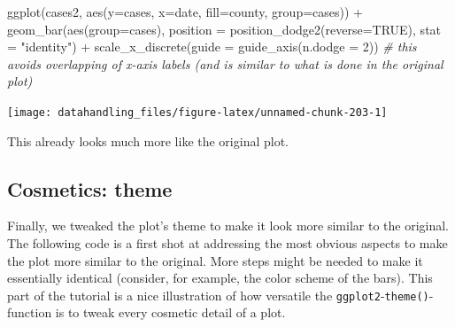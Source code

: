 \documentclass[
  12pt,
]{style/krantz}
\newenvironment{Shaded}{\begin{snugshade}}{\end{snugshade}}
\newcommand{\AttributeTok}[1]{\textcolor[rgb]{0.77,0.63,0.00}{#1}}
\newcommand{\CommentTok}[1]{\textcolor[rgb]{0.56,0.35,0.01}{\textit{#1}}}
\newcommand{\ConstantTok}[1]{\textcolor[rgb]{0.00,0.00,0.00}{#1}}
\newcommand{\DecValTok}[1]{\textcolor[rgb]{0.00,0.00,0.81}{#1}}
\newcommand{\FunctionTok}[1]{\textcolor[rgb]{0.00,0.00,0.00}{#1}}
\newcommand{\NormalTok}[1]{#1}
\newcommand{\SpecialCharTok}[1]{\textcolor[rgb]{0.00,0.00,0.00}{#1}}
\newcommand{\StringTok}[1]{\textcolor[rgb]{0.31,0.60,0.02}{#1}}
\begin{document}
\begin{Shaded}
\begin{Highlighting}[]
\FunctionTok{ggplot}\NormalTok{(cases2, }\FunctionTok{aes}\NormalTok{(}\AttributeTok{y=}\NormalTok{cases, }\AttributeTok{x=}\NormalTok{date, }\AttributeTok{fill=}\NormalTok{county, }\AttributeTok{group=}\NormalTok{cases)) }\SpecialCharTok{+}
  \FunctionTok{geom\_bar}\NormalTok{(}\FunctionTok{aes}\NormalTok{(}\AttributeTok{group=}\NormalTok{cases), }\AttributeTok{position =} \FunctionTok{position\_dodge2}\NormalTok{(}\AttributeTok{reverse=}\ConstantTok{TRUE}\NormalTok{), }\AttributeTok{stat =} \StringTok{"identity"}\NormalTok{) }\SpecialCharTok{+}
    \FunctionTok{scale\_x\_discrete}\NormalTok{(}\AttributeTok{guide =} \FunctionTok{guide\_axis}\NormalTok{(}\AttributeTok{n.dodge =} \DecValTok{2}\NormalTok{))  }\CommentTok{\# this avoids overlapping of x{-}axis labels (and is similar to what is done in the original plot)}
\end{Highlighting}
\end{Shaded}

\texttt{[image: datahandling\_files/figure-latex/unnamed-chunk-203-1]}

This already looks much more like the original plot.

\hypertarget{cosmetics-theme}{%
\subsection{Cosmetics: theme}\label{cosmetics-theme}}

Finally, we tweaked the plot's theme to make it look more similar to the original. The following code is a first shot at addressing the most obvious aspects to make the plot more similar to the original. More steps might be needed to make it essentially identical (consider, for example, the color scheme of the bars). This part of the tutorial is a nice illustration of how versatile the \texttt{ggplot2}-\texttt{theme()}-function is to tweak every cosmetic detail of a plot.
\end{document}
